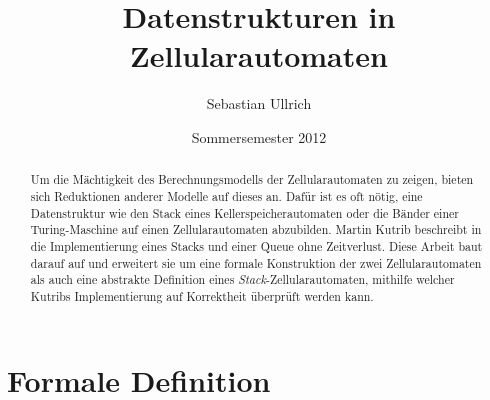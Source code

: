 \documentclass{article}
\title{Datenstrukturen in Zellularautomaten}
\author{Sebastian Ullrich}
\date{Sommersemester 2012}
\begin{document}
\newcommand{\ca}{\ensuremath\mathcal{A}}
\newcommand{\abs}[1]{\lvert#1\rvert}
\newcommand{\ceil}[1]{\lceil#1\rceil}
\newcommand{\zrange}[1]{\{1,\dots,#1\}}
\newcommand{\bild}[1]{\text{Bild}(#1)}
\newcommand{\N}{\mathbb{N}}
\newcommand{\ve}[3]{\begin{pmatrix}#1\\#2\\#3\end{pmatrix}}
\newcommand{\vet}[2]{\begin{pmatrix}#1\\#2\end{pmatrix}}

\newcommand{\pop}{\ensuremath{\mathit{pop}}\xspace}
\newcommand{\popZiel}{\ensuremath{\mathit{popZiel}}\xspace}
\newcommand{\popQuelle}{\ensuremath{\mathit{popQuelle}}\xspace}
\newcommand{\nop}{\ensuremath{\mathit{nop}}\xspace}
\newcommand{\push}{\ensuremath{\mathit{push}}\xspace}
\newcommand{\pushZiel}{\ensuremath{\mathit{pushZiel}}\xspace}
\newcommand{\pushQuelle}{\ensuremath{\mathit{pushQuelle}}\xspace}
\newcommand{\enqueue}{\ensuremath{\mathit{enqueue}}\xspace}
\newcommand{\dequeue}{\ensuremath{\mathit{dequeue}}\xspace}
\newcommand{\shiftUp}{\ensuremath{\mathit{shiftUp}}\xspace}
\newcommand{\demogrid}[1]{
    \begin{scope}
        \clip (-0.1,-0.1) rectangle (3.5,#1+0.1);
        \draw (1) (0,0) grid (4,#1);
    \end{scope}
}

\maketitle
\newpage
\mbox{}
\newpage

\begin{abstract}
	Um die Mächtigkeit des Berechnungsmodells der Zellularautomaten zu zeigen, bieten sich Reduktionen anderer Modelle auf dieses an. Dafür ist es oft nötig, eine Datenstruktur wie den Stack eines Kellerspeicherautomaten oder die Bänder einer Turing-Maschine auf einen Zellularautomaten abzubilden. Martin Kutrib beschreibt in \cite{kutrib08} die Implementierung eines Stacks und einer Queue ohne Zeitverlust. Diese Arbeit baut darauf auf und erweitert sie um eine formale Konstruktion der zwei Zellularautomaten als auch eine abstrakte Definition eines \emph{Stack}-Zellularautomaten, mithilfe welcher Kutribs Implementierung auf Korrektheit überprüft werden kann.
\end{abstract}

\section{Formale Definition}
\end{document}
